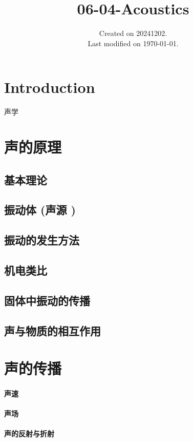 \documentclass[UTF8]{../06-Physics}
\begin{document}
\title{06-04-Acoustics}
\date{Created on 20241202.\\   Last modified on \today.}
\maketitle
\tableofcontents




\chapter{Introduction}
声学

\chapter{声的原理}
    \section{基本理论}
    \section{振动体 (声源 )}
    \section{振动的发生方法}
    \section{机电类比}
    \section{固体中振动的传播}
    \section{声与物质的相互作用}

\chapter{声的传播}
    \subsubsection{声速}
    \subsubsection{声场}
    \subsubsection{声的反射与折射}
\end{document}
